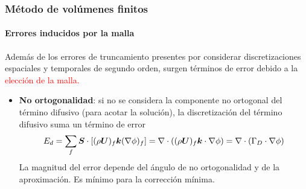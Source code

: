\begin{frame}
    \frametitle{M\'etodo de vol\'umenes finitos}
    \framesubtitle{Errores inducidos por la malla}

    \begin{center}
      Adem\'as de los errores de truncamiento presentes por considerar discretizaciones espaciales y temporales de segundo orden, surgen t\'erminos de error debido a la \textcolor{red}{elecci\'on de la malla. }
      \end{center}

    \begin{itemize}

    \item \textbf{No ortogonalidad}: si no se considera la componente no ortogonal del t\'ermino difusivo (para acotar la soluci\'on), la discretizaci\'on del t\'ermino difusivo suma un t\'ermino de error
      $$ E_d = \sum_f \boldsymbol{S} \cdot \left [ (\rho \boldsymbol{U})_f \boldsymbol{k} (\nabla \phi)_f  \right ]  = \nabla \cdot ( (\rho \boldsymbol{U})_f \boldsymbol{k} \cdot \nabla \phi) = \nabla \cdot (\Gamma_D \cdot \nabla \phi)$$
      La magnitud del error depende del \'angulo de no ortogonalidad y de la aproximaci\'on. Es m\'inimo para la correcci\'on m\'inima.
      
      
    \end{itemize}

\end{frame}


